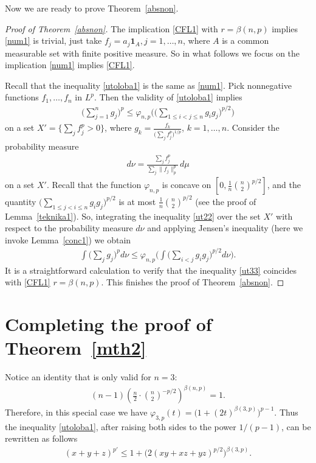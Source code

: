 \documentclass[11pt]{article}
\theoremstyle{definition}
\newcommand{\1}{\mathbf{1}}
\begin{document}
Now we are ready to prove Theorem~\ref{absnon}. 

\begin{proof}[Proof of Theorem~\ref{absnon}]
The implication \eqref{CFL1} with $r=\beta(n,p)$ implies \eqref{num1} is trivial, just take $f_{j} = a_{j} \mathbf{1}_{A}, j=1, \ldots, n$, where $A$ is a common measurable set with finite positive measure. So in what follows we focus on the implication \eqref{num1} implies \eqref{CFL1}. 

Recall that the inequality \eqref{utoloba1} is the same as  \eqref{num1}. Pick nonnegative functions $f_{1},\ldots, f_{n}$ in $L^{p}$. Then the validity of \eqref{utoloba1} implies 
\begin{align}\label{ut22}
    \Big(\sum_{j=1}^{n} g_{j} \Big)^{p} \leq \varphi_{n,p}\Big(\Big(\sum_{1\leq i<j\leq n} g_{i} g_{j}\Big)^{p/2} \Big)
\end{align}
on a set $X' = \{ \sum_{j} f^{p}_{j}>0\}$, where $g_{k} = \frac{f_{k}}{\big(\sum_{j} f_{j}^{p}\big)^{1/p}}$, $k=1,\ldots,n$.  Consider the probability measure 
\begin{align*}
    d\nu = \frac{\sum_{j} f_{j}^{p}}{\sum_{j} \|f_{j}\|_{p}^{p}}\, d\mu
\end{align*}
on a set $X'$. Recall that the function $\varphi_{n,p}$ is concave on $[0, \frac{1}{n} \binom{n}{2}^{p/2}]$, and the quantity $\Big(\sum_{1\leq j<i\leq n}g_{i}g_{j} \Big)^{p/2}$ is at most $\frac{1}{n} \binom{n}{2}^{p/2}$ (see the proof of Lemma~\ref{teknika1}). So, integrating the inequality \eqref{ut22} over the set $X'$ with respect to the probability measure $d\nu$ and applying Jensen's inequality (here we invoke Lemma~\ref{conc1}) we obtain 
\begin{align}\label{ut33}
    \int \Big(\sum_{j} g_{j} \Big)^{p} d\nu   \leq \varphi_{n,p}\Big( \int \Big(\sum_{i<j} g_{i} g_{j}\Big)^{p/2} d\nu \Big).
\end{align}
 It is a straightforward calculation to verify that the inequality \eqref{ut33} coincides with \eqref{CFL1}  $r=\beta(n,p)$.  This finishes the proof of Theorem~\ref{absnon}.
\end{proof}

\section{Completing the proof of Theorem~\ref{mth2}}\label{mivedi}

Notice an identity that is only valid for $n=3$:
\begin{align}\label{eq: nice identity for n=3}
    (n-1) \left( \frac{n}{2}\cdot \binom{n}{2}^{-p/2}\right)^{\beta(n,p)}=1.
\end{align}
Therefore, in this special case we have $\varphi_{3,p}(t) = \Big(1+(2t)^{\beta(3,p)}\Big)^{p-1}$. Thus the inequality \eqref{utoloba1}, after raising both sides to the power $1/(p-1)$, can be rewritten as follows 
\begin{align*}
(x+y+z)^{p'} \leq 1+\Big(2(xy+xz+yz)^{p/2}\Big)^{\beta(3,p)}.
\end{align*}
\end{document}
